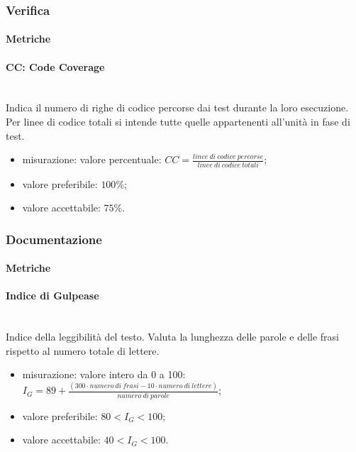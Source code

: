 	\subsubsection{Verifica}
		\paragraph{Metriche}
			\paragraph*{CC: Code Coverage}\mbox{}\\
				Indica il numero di righe di codice percorse dai test durante la loro esecuzione. Per linee di codice totali si intende tutte quelle appartenenti all'unità in fase di test.
				\begin{itemize}
					\item misurazione: valore percentuale: $CC = \frac{linee\ di\ codice\ percorse}{linee\ di\ codice\ totali}$;
					\item valore preferibile: $100\%$;
					\item valore accettabile: $75\%$.
				\end{itemize}
	\subsubsection{Documentazione}
		\paragraph{Metriche}
			\paragraph*{Indice di Gulpease}\mbox{}\\
			Indice della leggibilità del testo. Valuta la lunghezza delle parole e delle frasi rispetto al numero totale di lettere. 
			\begin{itemize}
				\item misurazione: valore intero da 0 a 100:\newline 	
				$I_G = 89+ \frac{(300 \cdot numero\ di\ frasi - 10 \cdot numero\ di\ lettere)}{numero\ di\ parole}$;	
				\item valore preferibile: $80 < I_G < 100$;
				\item valore accettabile: $40 < I_G < 100$.
			\end{itemize}

